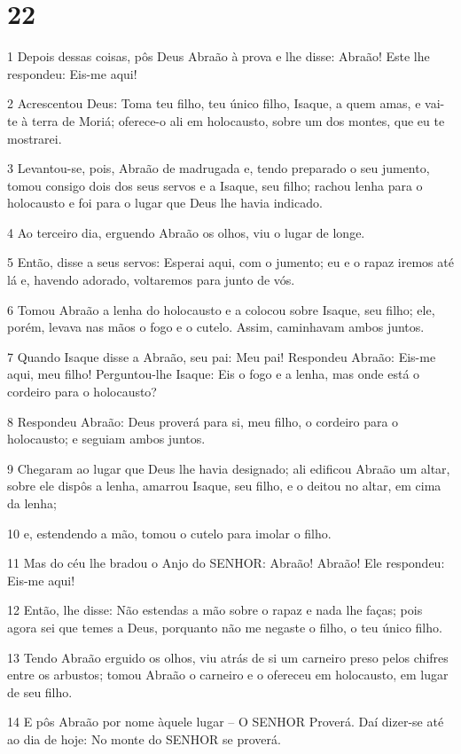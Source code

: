 \chapter{22}

\par 1 Depois dessas coisas, pôs Deus Abraão à prova e lhe disse: Abraão! Este lhe respondeu: Eis-me aqui!
\par 2 Acrescentou Deus: Toma teu filho, teu único filho, Isaque, a quem amas, e vai-te à terra de Moriá; oferece-o ali em holocausto, sobre um dos montes, que eu te mostrarei.
\par 3 Levantou-se, pois, Abraão de madrugada e, tendo preparado o seu jumento, tomou consigo dois dos seus servos e a Isaque, seu filho; rachou lenha para o holocausto e foi para o lugar que Deus lhe havia indicado.
\par 4 Ao terceiro dia, erguendo Abraão os olhos, viu o lugar de longe.
\par 5 Então, disse a seus servos: Esperai aqui, com o jumento; eu e o rapaz iremos até lá e, havendo adorado, voltaremos para junto de vós.
\par 6 Tomou Abraão a lenha do holocausto e a colocou sobre Isaque, seu filho; ele, porém, levava nas mãos o fogo e o cutelo. Assim, caminhavam ambos juntos.
\par 7 Quando Isaque disse a Abraão, seu pai: Meu pai! Respondeu Abraão: Eis-me aqui, meu filho! Perguntou-lhe Isaque: Eis o fogo e a lenha, mas onde está o cordeiro para o holocausto?
\par 8 Respondeu Abraão: Deus proverá para si, meu filho, o cordeiro para o holocausto; e seguiam ambos juntos.
\par 9 Chegaram ao lugar que Deus lhe havia designado; ali edificou Abraão um altar, sobre ele dispôs a lenha, amarrou Isaque, seu filho, e o deitou no altar, em cima da lenha;
\par 10 e, estendendo a mão, tomou o cutelo para imolar o filho.
\par 11 Mas do céu lhe bradou o Anjo do SENHOR: Abraão! Abraão! Ele respondeu: Eis-me aqui!
\par 12 Então, lhe disse: Não estendas a mão sobre o rapaz e nada lhe faças; pois agora sei que temes a Deus, porquanto não me negaste o filho, o teu único filho.
\par 13 Tendo Abraão erguido os olhos, viu atrás de si um carneiro preso pelos chifres entre os arbustos; tomou Abraão o carneiro e o ofereceu em holocausto, em lugar de seu filho.
\par 14 E pôs Abraão por nome àquele lugar -- O SENHOR Proverá. Daí dizer-se até ao dia de hoje: No monte do SENHOR se proverá.
